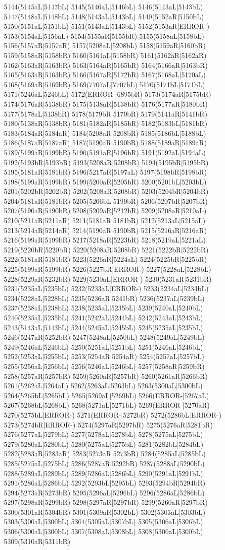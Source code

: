 5144(5145aL|5147bL) 5145(5146aL|5146bL) 5146(5143aL|5143bL) 5147(5148aL|5148bL) 5148(5143aL|5143bL) 5149(5152aR|5150bL) 5150(5151aL|5151bL) 5151(5143aL|5143bL) 5152(5153aR|ERROR-) 5153(5154aL|5156aL) 5154(5155aR|5155bR) 5155(5158aL|5158bL) 5156(5157aR|5157aR) 5157(5208aL|5208bL) 5158(5159aR|5160bR) 5159(5158aR|5158bR) 5160(5161aL|5158bR) 5161(5162aR|5162aR) 5162(5163aR|5163bR) 5163(5164aR|5165bR) 5164(5166aR|5163bR) 5165(5163aR|5163bR) 5166(5167aR|5172bR) 5167(5168aL|5170aL) 5168(5169aR|5169bR) 5169(7707aL|7707bL) 5170(5171bL|5171bL) 5171(5246aL|5246bL) 5172(ERROR-|6895bR) 5173(5174aR|5175bR) 5174(5176aR|5138bR) 5175(5138aR|5138bR) 5176(5177aR|5180bR) 5177(5178aL|5138bR) 5178(5179bR|5179bR) 5179(5141aR|5141bR) 5180(5138aR|5138bR) 5181(5182aR|5185bR) 5182(5183bL|5181bR) 5183(5184aR|5184aR) 5184(5208aR|5208bR) 5185(5186bL|5188bL) 5186(5187aR|5187aR) 5187(5190aR|5190bR) 5188(5189aR|5189aR) 5189(5199aR|5199bR) 5190(5191aR|5196bR) 5191(5192aL|5194aL) 5192(5193bR|5193bR) 5193(5208aR|5208bR) 5194(5195bR|5195bR) 5195(5181aR|5181bR) 5196(5217aR|5197aL) 5197(5198bR|5198bR) 5198(5199aR|5199bR) 5199(5200aR|5205bR) 5200(5201bL|5203bL) 5201(5202bR|5202bR) 5202(5208aR|5208bR) 5203(5204bR|5204bR) 5204(5181aR|5181bR) 5205(5206bL|5199bR) 5206(5207bR|5207bR) 5207(5190aR|5190bR) 5208(5209aR|5212bR) 5209(5208aR|5210aL) 5210(5211aR|5211aR) 5211(5181aR|5181bR) 5212(5213aL|5215aL) 5213(5214aR|5214aR) 5214(5190aR|5190bR) 5215(5216aR|5216aR) 5216(5199aR|5199bR) 5217(5218aR|5223bR) 5218(5219aL|5221aL) 5219(5220bR|5220bR) 5220(5208aR|5208bR) 5221(5222bR|5222bR) 5222(5181aR|5181bR) 5223(5226aR|5224aL) 5224(5225bR|5225bR) 5225(5199aR|5199bR) 5226(5227bR|ERROR-) 5227(5228aL|5228bL) 5228(5229aR|5232bR) 5229(5230aL|ERROR-) 5230(5231aR|5231bR) 5231(5235aL|5235bL) 5232(5233aL|ERROR-) 5233(5234aL|5234bL) 5234(5228aL|5228bL) 5235(5236aR|5241bR) 5236(5237aL|5239bL) 5237(5238aL|5238bL) 5238(5235aL|5235bL) 5239(5240aL|5240bL) 5240(5235aL|5235bL) 5241(5242aL|5244bL) 5242(5243aL|5243bL) 5243(5143aL|5143bL) 5244(5245aL|5245bL) 5245(5235aL|5235bL) 5246(5247aR|5252bR) 5247(5248aL|5250bL) 5248(5249aL|5249bL) 5249(5246aL|5246bL) 5250(5251aL|5251bL) 5251(5246aL|5246bL) 5252(5253aL|5255bL) 5253(5254aR|5254aR) 5254(5257aL|5257bL) 5255(5256aL|5256bL) 5256(5246aL|5246bL) 5257(5258aR|5259bR) 5258(5257aR|5257bR) 5259(5260aR|5257bR) 5260(5261aR|5266bR) 5261(5262aL|5264aL) 5262(5263aL|5263bL) 5263(5300aL|5300bL) 5264(5265bL|5265bL) 5265(5269aL|5269bL) 5266(ERROR-|5267aL) 5267(5268bL|5268bL) 5268(5271aL|5271bL) 5269(ERROR-|5270aR) 5270(5275bL|ERROR-) 5271(ERROR-|5272bR) 5272(5286bL|ERROR-) 5273(5274bR|ERROR-) 5274(5297aR|5297bR) 5275(5276aR|5281bR) 5276(5277aL|5279bL) 5277(5278aL|5278bL) 5278(5275aL|5275bL) 5279(5280aL|5280bL) 5280(5275aL|5275bL) 5281(5282bL|5284bL) 5282(5283aR|5283aR) 5283(5273aR|5273bR) 5284(5285aL|5285bL) 5285(5275aL|5275bL) 5286(5287aR|5292bR) 5287(5288aL|5290bL) 5288(5289aL|5289bL) 5289(5286aL|5286bL) 5290(5291aL|5291bL) 5291(5286aL|5286bL) 5292(5293bL|5295bL) 5293(5294bR|5294bR) 5294(5273aR|5273bR) 5295(5296aL|5296bL) 5296(5286aL|5286bL) 5297(5298aR|5299bR) 5298(5297aR|5297bR) 5299(5260aR|5297bR) 5300(5301aR|5304bR) 5301(5309aR|5302bL) 5302(5303aL|5303bL) 5303(5300aL|5300bL) 5304(5305aL|5307bL) 5305(5306aL|5306bL) 5306(5300aL|5300bL) 5307(5308aL|5308bL) 5308(5300aL|5300bL) 5309(5310aR|5311bR) 